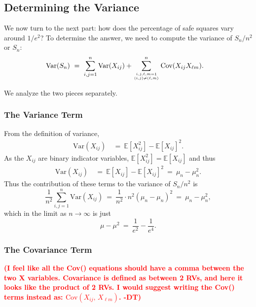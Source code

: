 \documentclass[12pt,reqno]{amsart}
\newcommand{\E}{\mathbb{E}}
\renewcommand{\E}{\mathbb{E}}
\numberwithin{equation}{section}
\theoremstyle{plain}
\newcommand\be{\begin{equation}}
\newcommand\ee{\end{equation}}
\newcommand{\fix}[1]{\textcolor{red}{\textbf{\large (#1)\normalsize}}}
\begin{document}
\subsection{Determining the Variance}

We now turn to the next part: how does the percentage of safe squares vary around $1/e^2$? To determine the answer, we need to compute the variance of $S_n/n^2$ or $S_n$:
\begin{align}\label{eq:varcovarexpansion}
    \text{Var}(S_n) &\ = \  \sum_{i,j = 1}^n \text{Var}(X_{ij}) + \sum_{i,j,\ell,m=1 \atop (i,j) \neq (\ell,m)}^n\text{Cov}(X_{ij}X_{\ell m}).
\end{align}

We analyze the two pieces separately. 

\subsubsection{The Variance Term}

From the definition of variance,
\begin{align}
   \text{Var}\left(X_{ij}\right) &\ = \  \E[X_{ij}^2] - \E[X_{ij}]^2.
\end{align} As the $X_{ij}$ are binary indicator variables, $\E[X_{ij}^2] = \E[X_{ij}]$ and thus
\begin{align}
   \text{Var}\left(X_{ij}\right) &\ = \  \E[X_{ij}] - \E[X_{ij}]^2 \  = \ \mu_n - \mu_n^2.
\end{align}  Thus the contribution of these terms to the variance of $S_n/n^2$ is \be \frac1{n^2} \sum_{i,j = 1}^n \text{Var}(X_{ij}) \ = \ \frac1{n^2} \cdot n^2 (\mu_n - \mu_n)^2 \ = \ \mu_n - \mu_n^2,\ee which in the limit as $n\to\infty$ is just \be \mu - \mu^2 \ = \ \frac1{e^2} - \frac1{e^4}. \ee


\subsubsection{The Covariance Term}


\fix{I feel like all the Cov() equations should have a comma between the two X variables.  Covariance is defined as between 2 RVs, and here it looks like the product of 2 RVs. I would suggest writing the Cov() terms instead as: $\text{Cov}\left(X_{ij}, \, X_{\ell m}\right)$. -DT}
\end{document}
